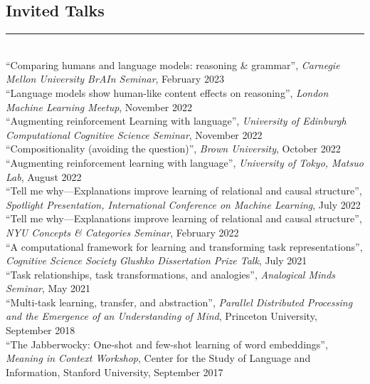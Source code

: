 \documentclass[margin]{res}
\begin{document}
\begin{resume}
\vspace{1pt}\section{Invited Talks} \vspace{-15pt} \rule{\textwidth}{0.5pt} \\[3pt]
{``Comparing humans and language models: reasoning \& grammar'',} \textit{Carnegie Mellon University BrAIn Seminar}, February 2023\\[3pt] 
{``Language models show human-like content effects on reasoning'',} \textit{London Machine Learning Meetup}, November 2022\\[3pt] 
{``Augmenting reinforcement Learning with language'',} \textit{University of Edinburgh Computational Cognitive Science Seminar}, November 2022\\[3pt] 
{``Compositionality (avoiding the question)'',} \textit{Brown University}, October 2022\\[3pt] 
{``Augmenting reinforcement learning with language'',} \textit{University of Tokyo, Matsuo Lab}, August 2022\\[3pt] 
{``Tell me why---Explanations improve learning of relational and causal structure'',} \textit{Spotlight Presentation, International Conference on Machine Learning}, July 2022\\[3pt] 
{``Tell me why---Explanations improve learning of relational and causal structure'',} \textit{NYU Concepts \& Categories Seminar}, February 2022\\[3pt] 
{``A computational framework for learning and transforming task representations'',} \textit{Cognitive Science Society Glushko Dissertation Prize Talk}, July 2021\\[3pt] 
{``Task relationships, task transformations, and analogies'',} \textit{Analogical Minds Seminar}, May 2021\\[3pt] 
{``Multi-task learning, transfer, and abstraction'',} \textit{Parallel Distributed Processing and the Emergence of an Understanding of Mind}, Princeton University, September 2018\\[3pt] 
{``The Jabberwocky: One-shot and few-shot learning of word embeddings'',} \textit{Meaning in Context Workshop}, Center for the Study of Language and Information,  Stanford University, September 2017 
 

\end{resume}
\end{document}
